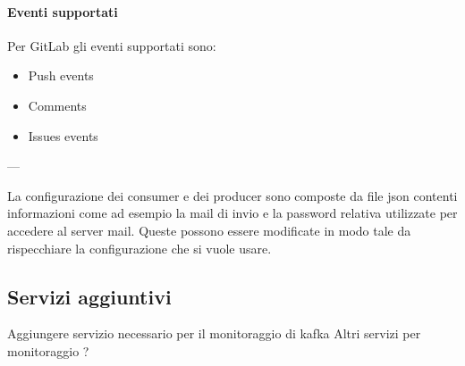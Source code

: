 		\paragraph{Eventi supportati}
		Per GitLab gli eventi supportati sono:
		\begin{itemize}
			\item Push events
			\item Comments
			\item Issues events
		\end{itemize}


---


	La configurazione dei consumer e dei producer sono composte da file json contenti informazioni come ad esempio la mail di invio e la password relativa utilizzate per accedere al server mail.
	Queste possono essere modificate in modo tale da rispecchiare la configurazione che si vuole usare.

\subsection{Servizi aggiuntivi}
Aggiungere servizio necessario per il monitoraggio di kafka
Altri servizi per monitoraggio ?
